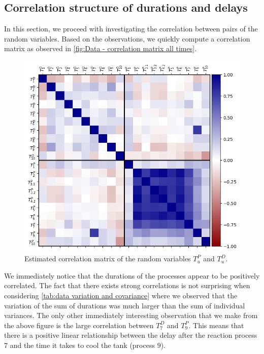 \documentclass[../Thesis.tex]{subfiles}
\begin{document}
\subsection{Correlation structure of durations and delays}
In this section, we proceed with investigating the correlation between pairs of the random variables. Based on the observations, we quickly compute a correlation matrix as observed in \autoref{fig:Data - correlation matrix all times}.
\begin{figure}[H]
    \centering
    \includegraphics[width=.9\linewidth]{figures/Multiple cycles data/Correlation matrix production and delays.png}
    \caption{Estimated correlation matrix of the random variables $T^P_u$ and $T^D_u$.}
    \label{fig:Data - correlation matrix all times}
\end{figure}
We immediately notice that the durations of the processes appear to be positively correlated. The fact that there exists strong correlations is not surprising when considering \autoref{tab:data variation and covariance} where we observed that the variation of the sum of durations was much larger than the sum of individual variances. The only other immediately interesting observation that we make from the above figure is the large correlation between $T^D_7$ and $T^P_9$. This means that there is a positive linear relationship between the delay after the reaction process $7$ and the time it takes to cool the tank (process $9$).
\end{document}
